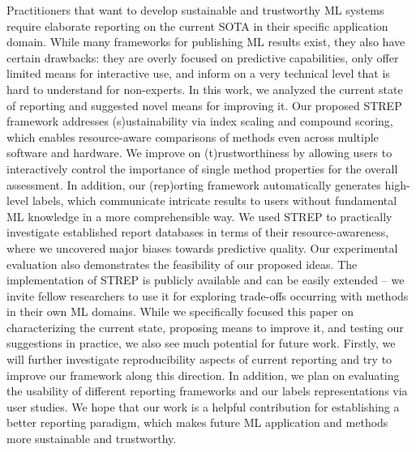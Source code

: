 \documentclass[sn-mathphys,Numbered]{sn-jnl}%
\theoremstyle{thmstylethree}%
\begin{document}
Practitioners that want to develop sustainable and trustworthy ML systems require elaborate reporting on the current SOTA in their specific application domain.
While many frameworks for publishing ML results exist, they also have certain drawbacks: they are overly focused on predictive capabilities, only offer limited means for interactive use, and inform on a very technical level that is hard to understand for non-experts.
In this work, we analyzed the current state of reporting and suggested novel means for improving it.
Our proposed STREP framework addresses (s)ustainability via index scaling and compound scoring, which enables resource-aware comparisons of methods even across multiple software and hardware.
We improve on (t)rustworthiness by allowing users to interactively control the importance of single method properties for the overall assessment.
In addition, our (rep)orting framework automatically generates high-level labels, which communicate intricate results to users without fundamental ML knowledge in a more comprehensible way.
We used STREP to practically investigate established report databases in terms of their resource-awareness, where we uncovered major biases towards predictive quality.
Our experimental evaluation also demonstrates the feasibility of our proposed ideas.
The implementation of STREP is publicly available and can be easily extended -- we invite fellow researchers to use it for exploring trade-offs occurring with methods in their own ML domains.
While we specifically focused this paper on characterizing the current state, proposing means to improve it, and testing our suggestions in practice, we also see much potential for future work.
Firstly, we will further investigate reproducibility aspects of current reporting and try to improve our framework along this direction.
In addition, we plan on evaluating the usability of different reporting frameworks and our labels representations via user studies.
We hope that our work is a helpful contribution for establishing a better reporting paradigm, which makes future ML application and methods more sustainable and trustworthy.



\end{document}

